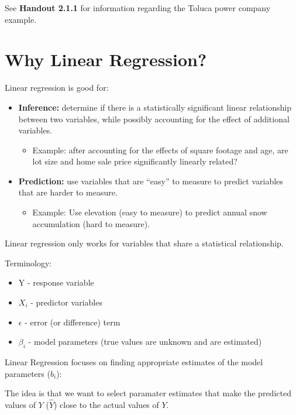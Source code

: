 \documentclass[12pt]{../notes}
\begin{document}

See \textbf{Handout 2.1.1} for information regarding the Toluca power company example.

\section{Why Linear Regression?}

\nspace
Linear regression is good for: 
\begin{itemize}
\item \textbf{Inference:} determine if there is a statistically significant linear relationship between two variables, while possibly accounting for the effect of additional variables. 
\begin{itemize}
\item Example: after accounting for the effects of square footage and age, are lot size and home sale price significantly linearly related?  
\end{itemize} 
\item \textbf{Prediction:} use variables that are ``easy'' to measure to predict variables that are harder to measure.  
\begin{itemize}
\item Example: Use elevation (easy to measure) to predict annual snow accumulation (hard to measure). 
\end{itemize} 
\end{itemize}

\nspace
Linear regression only works for variables that share a statistical relationship.

\nspace
Terminology: 

\begin{itemize}
\item Y - response variable
\item $X_i$ - predictor variables
\item $\epsilon$ - error (or difference) term
\item $\beta_i$ - model parameters (true values are unknown and are estimated)
\end{itemize}

\nspace
Linear Regression focuses on finding appropriate estimates of the model parameters ($b_i$):

\nspace
The idea is that we want to select paramater estimates that make the predicted values of $Y$ ($\hat{Y}$) close to the actual values of $Y$.
\end{document}
